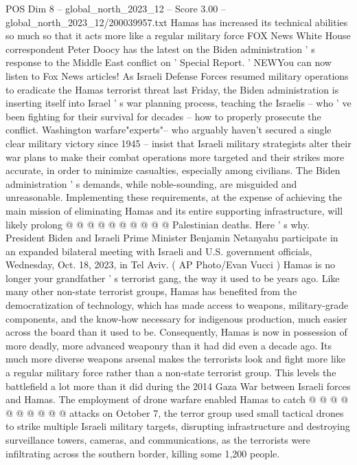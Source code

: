\begin{textsample}{POS Dim 8 – global\_north\_2023\_12 – Score 3.00 – global\_north\_2023\_12/200039957.txt}  \label{ex:f8_pos_279}
Hamas has increased its technical abilities so much so that it acts more like a regular military force FOX News White House correspondent Peter Doocy has the latest on the Biden administration ' s response to the Middle East conflict on ' Special Report. ' NEWYou can now listen to Fox News articles!
As Israeli Defense Forces resumed military operations to eradicate the Hamas terrorist threat last Friday, the Biden administration is inserting itself into Israel ' s war planning process, teaching the Israelis -- who ' ve been fighting for their survival for decades -- how to properly prosecute the conflict.
Washington warfare"experts"-- who arguably haven't secured a single clear military victory since 1945 -- insist that Israeli military strategists alter their war plans to make their combat operations more targeted and their strikes more accurate, in order to minimize casualties, especially among civilians.
The Biden administration ' s demands, while noble-sounding, are misguided and unreasonable.
Implementing these requirements, at the expense of achieving the main mission of eliminating Hamas and its entire supporting infrastructure, will likely prolong @ @ @ @ @ @ @ @ @ @ Palestinian deaths.
Here ' s why.
President Biden and Israeli Prime Minister Benjamin Netanyahu participate in an expanded bilateral meeting with Israeli and U.S. government officials, Wednesday, Oct. 18, 2023, in Tel Aviv. ( AP Photo/Evan Vucci ) Hamas is no longer your grandfather ' s terrorist gang, the way it used to be years ago.
Like many other non-state terrorist groups, Hamas has benefited from the democratization of technology, which has made access to weapons, military-grade components, and the know-how necessary for indigenous production, much easier across the board than it used to be.
Consequently, Hamas is now in possession of more deadly, more advanced weaponry than it had did even a decade ago.
Its much more diverse weapons arsenal makes the terrorists look and fight more like a regular military force rather than a non-state terrorist group.
This levels the battlefield a lot more than it did during the 2014 Gaza War between Israeli forces and Hamas.
The employment of drone warfare enabled Hamas to catch @ @ @ @ @ @ @ @ @ @ attacks on October 7, the terror group used small tactical drones to strike multiple Israeli military targets, disrupting infrastructure and destroying surveillance towers, cameras, and communications, as the terrorists were infiltrating across the southern border, killing some 1,200 people.

\end{textsample}
